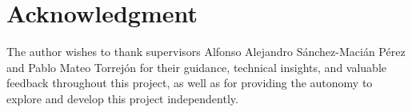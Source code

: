 \documentclass[conference]{IEEEtran}
\begin{document}
\section*{Acknowledgment}

The author wishes to thank supervisors Alfonso Alejandro Sánchez-Macián Pérez and Pablo Mateo Torrejón for their guidance, technical insights, and valuable feedback throughout this project, as well as for providing the autonomy to explore and develop this project independently.

\printbibliography



\end{document}

